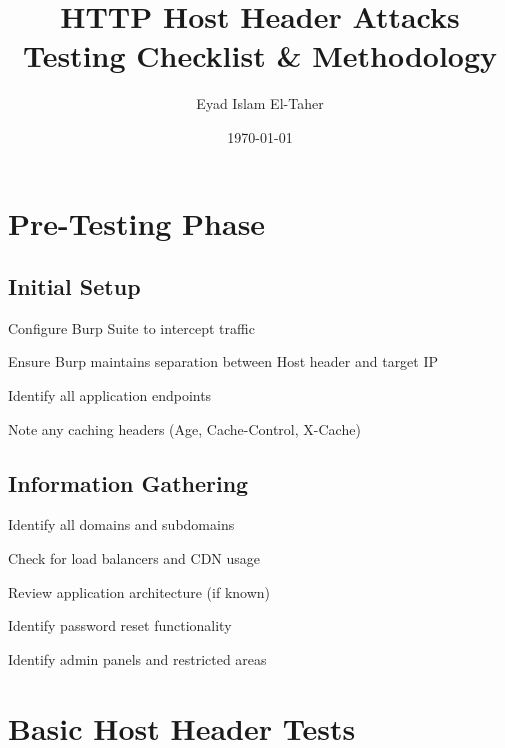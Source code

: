 \documentclass[12pt,a4paper]{article}
\title{
    \vspace{2cm}
    \Huge\textbf{HTTP Host Header Attacks} \\
    \vspace{0.5cm}
    \Large Testing Checklist \& Methodology
    \vspace{1cm}
}
\author{Eyad Islam El-Taher}
\date{\today}
\begin{document}
\maketitle
\tableofcontents
\newpage


\section{Pre-Testing Phase}

\subsection{Initial Setup}
\begin{checklistbox}
 Configure Burp Suite to intercept traffic
\end{checklistbox}
\begin{checklistbox}
 Ensure Burp maintains separation between Host header and target IP
\end{checklistbox}
\begin{checklistbox}
 Identify all application endpoints
\end{checklistbox}
\begin{checklistbox}
 Note any caching headers (Age, Cache-Control, X-Cache)
\end{checklistbox}

\subsection{Information Gathering}
\begin{checklistbox}
 Identify all domains and subdomains
\end{checklistbox}
\begin{checklistbox}
 Check for load balancers and CDN usage
\end{checklistbox}
\begin{checklistbox}
 Review application architecture (if known)
\end{checklistbox}
\begin{checklistbox}
 Identify password reset functionality
\end{checklistbox}
\begin{checklistbox}
 Identify admin panels and restricted areas
\end{checklistbox}

\section{Basic Host Header Tests}
\end{document}
